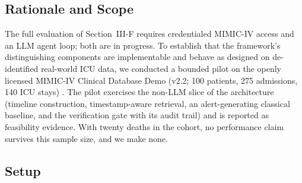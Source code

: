 \subsection{Rationale and Scope}

The full evaluation of Section~III-F requires credentialed MIMIC-IV access and an LLM agent
loop; both are in progress. To establish that the framework's distinguishing components are
implementable and behave as designed on de-identified real-world ICU data, we conducted a bounded pilot on the
openly licensed MIMIC-IV Clinical Database Demo (v2.2; 100 patients, 275 admissions, 140 ICU
stays) \cite{johnson2023mimic}. The pilot exercises the non-LLM slice of the architecture
(timeline construction, timestamp-aware retrieval, an alert-generating classical baseline, and
the verification gate with its audit trail) and is reported as feasibility evidence. With
twenty deaths in the cohort, no performance claim survives this sample size, and we make none.

\subsection{Setup}

